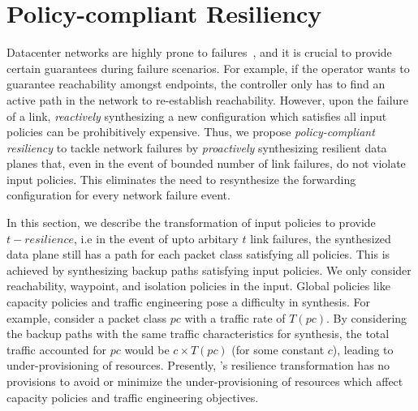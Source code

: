 \section{Policy-compliant Resiliency}
Datacenter networks are highly prone to failures~\cite{datacenterfailures}, 
and it is crucial to provide certain guarantees during failure
scenarios. For example, if the operator wants to guarantee
reachability amongst endpoints, the controller only has to find an active
path in the network to re-establish reachability. 
However, upon the failure of a link, {\em reactively} synthesizing a new configuration which satisfies
all input policies can be prohibitively expensive.
Thus, we propose 
\emph{policy-compliant resiliency} to tackle network failures
by \emph{proactively} synthesizing resilient data planes that, even in the event
of bounded number of link failures, do not violate input policies. This eliminates the 
need to resynthesize the forwarding
configuration for every network failure event.

In this section, we describe the transformation of input 
policies to provide $t-resilience$, i.e in the event of upto arbitary
$t$ link failures, the synthesized data plane still has a path
for each packet class  satisfying all policies. This is achieved
by synthesizing backup paths satisfying input policies.
We only consider reachability, waypoint,
and isolation policies in the input. 
Global policies like capacity policies
and traffic engineering pose a difficulty in synthesis. For example,
consider a packet class $pc$ with a traffic rate of $T(pc)$. By considering
the backup paths with the same traffic characteristics for synthesis, 
the total traffic 
accounted for $pc$ would be $c\times T(pc)$ (for some constant $c$), leading
to under-provisioning of resources. Presently, \name's resilience
transformation has no provisions to avoid or minimize 
the under-provisioning of resources which affect capacity policies
and traffic engineering objectives. 

